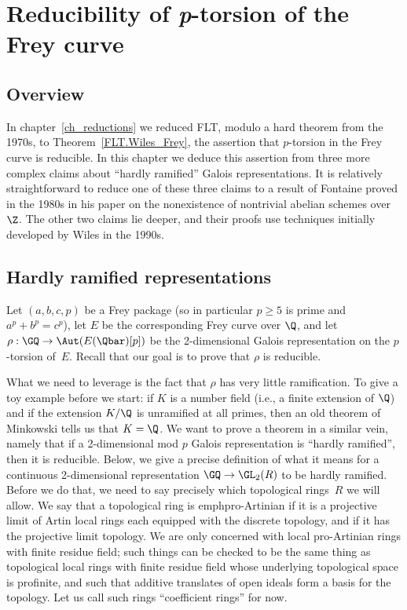 \chapter{Reducibility of {\it p}-torsion of the Frey curve}\label{ch_freyreduction}

\section{Overview}

In chapter~\ref{ch_reductions} we reduced FLT, modulo a hard theorem from the 1970s,
to Theorem~\ref{FLT.Wiles_Frey}, the assertion that $p$-torsion in the Frey
curve is reducible. In this chapter we deduce this assertion from three more complex claims
about ``hardly ramified'' Galois representations. It is relatively straightforward
to reduce one of these three claims to a result of Fontaine proved in the 1980s in his
paper on the nonexistence of nontrivial abelian schemes over $\Z$. The other two
claims lie deeper, and their proofs use techniques initially developed by Wiles in
the 1990s.

\section{Hardly ramified representations}

Let $(a,b,c,p)$ be a Frey package (so in particular $p\geq5$ is prime and $a^p+b^p=c^p$),
let $E$ be the corresponding Frey curve over $\Q$, and let $\rho:\GQ\to\Aut(E(\Qbar)[p])$
be the 2-dimensional Galois representation on the $p$-torsion of~$E$. Recall that our goal
is to prove that $\rho$ is reducible.

What we need to leverage is the fact that $\rho$ has very little ramification. To give
a toy example before we start: if $K$ is a number field (i.e., a finite extension of $\Q$)
and if the extension $K/\Q$ is unramified at all primes, then an old theorem of
Minkowski tells us that $K=\Q$. We want to prove a theorem in a similar vein, namely
that if a 2-dimensional mod $p$ Galois representation is ``hardly ramified'', then it is reducible.
Below, we give a precise
definition of what it means for a continuous 2-dimensional representation $\GQ\to\GL_2(R)$
to be hardly ramified. Before we do that, we need to say precisely which topological rings~$R$
we will allow. We say that a topological ring is emph{pro-Artinian} if it is a projective
limit of Artin local rings each equipped with the discrete topology, and if it has the
projective limit topology. We are only concerned with local pro-Artinian rings with finite
residue field; such things can be checked to be the same thing as topological
local rings with finite residue field whose underlying topological space is profinite,
and such that additive translates of open ideals form a basis for the topology.
Let us call such rings ``coefficient rings'' for now.

